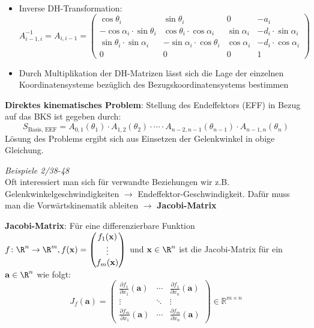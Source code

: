 \begin{itemize}
\begin{equation*}
\begin{split}
	\end{split}
	\end{equation*}
	\item Inverse DH-Transformation:
	\begin{equation*}
		A_{i-1,i}^{-1} = A_{i,i-1} = \left(\begin{matrix}
				\cos\theta_i & \sin\theta_i & 0 & -a_i \\
				-\cos\alpha_i\cdot\sin\theta_i & \cos\theta_i\cdot\cos\alpha_i & \sin\alpha_i & -d_i\cdot\sin\alpha_i \\
				\sin\theta_i\cdot\sin\alpha_i & -\sin\alpha_i\cdot\cos\theta_i & \cos\alpha_i & -d_i\cdot\cos\alpha_i \\
				0 & 0 & 0 & 1
			\end{matrix}\right)
	\end{equation*}
	\item Durch Multiplikation der DH-Matrizen lässt sich die Lage der einzelnen Koordinatensysteme bezüglich des Bezugskoordinatensystems bestimmen
\end{itemize}
\bigskip
\textbf{Direktes kinematisches Problem}: Stellung des Endeffektors (EFF) in Bezug auf das BKS ist gegeben durch: $$S_\text{Basis, EEF}=A_{0,1}(\theta_1)\cdot A_{1,2}(\theta_2)\cdot\cdots\cdot A_{n-2,n-1}(\theta_{n-1})\cdot A_{n-1,n}(\theta_n)$$
Lösung des Problems ergibt sich aus Einsetzen der Gelenkwinkel in obige Gleichung.

\textit{Beispiele 2/38-48}\\

Oft interessiert man sich für verwandte Beziehungen wir z.B. Gelenkwinkelgeschwindigkeiten $\rightarrow$ Endeffektor-Geschwindigkeit. Dafür muss man die Vorwärtskinematik ableiten $\rightarrow$ \textbf{Jacobi-Matrix}
\pagebreak

\textbf{Jacobi-Matrix}: Für eine differenzierbare Funktion $f\colon \R^n\rightarrow\R^m, f(\mathbf{x})=\left(\begin{matrix}
	f_1(\mathbf{x}) \\
	\vdots\\
	f_m(\mathbf{x})
\end{matrix}\right)$ und $\mathbf{x}\in\R^n$ ist die Jacobi-Matrix für ein $\mathbf{a}\in\R^n$ wie folgt:
$$
J_{f}(\mathbf{a})=\left(\begin{array}{ccc}
	\frac{\partial f_{1}}{\partial x_{1}}(\mathbf{a}) & \cdots & \frac{\partial f_{1}}{\partial x_{n}}(\mathbf{a}) \\
	\vdots & \ddots & \vdots \\
	\frac{\partial f_{m}}{\partial x_{1}}(\mathbf{a}) & \cdots & \frac{\partial f_{m}}{\partial x_{n}}(\mathbf{a})
\end{array}\right) \in \mathbb{R}^{m \times n}
$$

